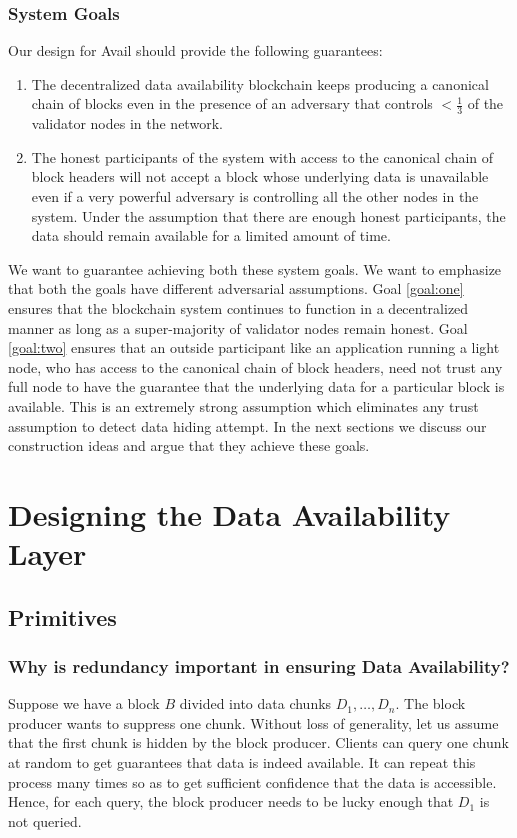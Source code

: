 \documentclass[sigconf, screen=true, nonacm]{acmart}
\begin{document}
        \subsubsection{System Goals}\label{goals}
            Our design for Avail should provide the following guarantees:
            \begin{enumerate}
                \item \label{goal:one} The decentralized data availability blockchain keeps producing a canonical chain of blocks even in the presence of an adversary that controls $<\!\!\frac{1}{3}$ of the validator nodes in the network. 
                \item \label{goal:two} The honest participants of the system with access to the canonical chain of block headers will not accept a block whose underlying data is unavailable even if a very powerful adversary is controlling all the other nodes in the system. Under the assumption that there are enough honest participants, the data should remain available for a limited amount of time. 
            \end{enumerate}
            We want to guarantee achieving both these system goals. We want to emphasize that both the goals have different adversarial assumptions. Goal \ref{goal:one} ensures that the blockchain system continues to function in a decentralized manner as long as a super-majority of validator nodes remain honest. Goal \ref{goal:two} ensures that an outside participant like an application running a light node, who has access to the canonical chain of block headers, need not trust any full node to have the guarantee that the underlying data for a particular block is available. This is an extremely strong assumption which eliminates any trust assumption to detect data hiding attempt. In the next sections we discuss our construction ideas and argue that they achieve these goals. 

\section{Designing the Data Availability Layer}
    \subsection{Primitives}
        \subsubsection{Why is redundancy important in ensuring Data Availability?}
            Suppose we have a block $B$ divided into data chunks $D_1, \dots, D_n$. The block producer wants to suppress one chunk. Without loss of generality, let us assume that the first chunk is hidden by the block producer. Clients can query one chunk at random to get guarantees that data is indeed available. It can repeat this process many times so as to get sufficient confidence that the data is accessible. Hence, for each query, the block producer needs to be lucky enough that $D_1$ is not queried.
\end{document}

